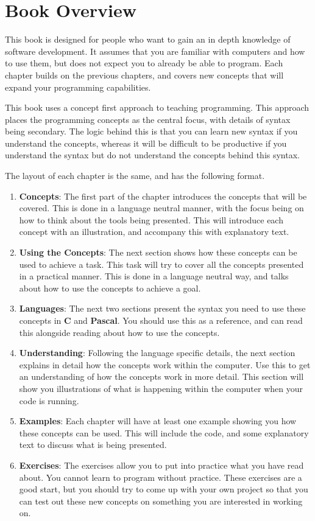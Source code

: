 \section*{Book Overview} %
\label{sub:book_overview}

This book is designed for people who want to gain an in depth knowledge of software development. It assumes that you are familiar with computers and how to use them, but does not expect you to already be able to program. Each chapter builds on the previous chapters, and covers new concepts that will expand your programming capabilities. 

This book uses a concept first approach to teaching programming. This approach places the programming concepts as the central focus, with details of syntax being secondary. The logic behind this is that you can learn new syntax if you understand the concepts, whereas it will be difficult to be productive if you understand the syntax but do not understand the concepts behind this syntax.

The layout of each chapter is the same, and has the following format. 
\begin{enumerate}
  \item \textbf{Concepts}: The first part of the chapter introduces the concepts that will be covered. This is done in a language neutral manner, with the focus being on how to think about the tools being presented. This will introduce each concept with an illustration, and accompany this with explanatory text.
  \item \textbf{Using the Concepts}: The next section shows how these concepts can be used to achieve a task. This task will try to cover all the concepts presented in a practical manner. This is done in a language neutral way, and talks about how to use the concepts to achieve a goal.
  \item \textbf{Languages}: The next two sections present the syntax you need to use these concepts in \textbf{C} and \textbf{Pascal}. You should use this as a reference, and can read this alongside reading about how to use the concepts.
  \item \textbf{Understanding}: Following the language specific details, the next section explains in detail how the concepts work within the computer. Use this to get an understanding of how the concepts work in more detail. This section will show you illustrations of what is happening within the computer when your code is running.
  \item \textbf{Examples}: Each chapter will have at least one example showing you how these concepts can be used. This will include the code, and some explanatory text to discuss what is being presented.
  \item \textbf{Exercises}: The exercises allow you to put into practice what you have read about. You cannot learn to program without practice. These exercises are a good start, but you should try to come up with your own project so that you can test out these new concepts on something you are interested in working on.
\end{enumerate}



